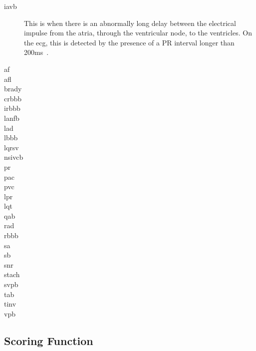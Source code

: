 \documentclass[\main/thesis.tex]{subfiles}
\begin{document}
\begin{description}
    \item[\gls{iavb}] This is when there is an abnormally long delay between the electrical impulse from the atria, through the ventricular node, to the ventricles. On the \gls{ecg}, this is detected by the presence of a PR interval longer than 200ms~\cite{carroz_pseudo-pacemaker_2010}.
    \item[\gls{af}]
    \item[\gls{afl}]
    \item[\gls{brady}]
    \item[\gls{crbbb}]
    \item[\gls{irbbb}]
    \item[\gls{lanfb}]
    \item[\gls{lad}]
    \item[\gls{lbbb}]
    \item[\gls{lqrsv}]
    \item[\gls{nsivcb}]
    \item[\gls{pr}]
    \item[\gls{pac}]
    \item[\gls{pvc}]
    \item[\gls{lpr}]
    \item[\gls{lqt}]
    \item[\gls{qab}]
    \item[\gls{rad}]
    \item[\gls{rbbb}]
    \item[\gls{sa}]
    \item[\gls{sb}]
    \item[\gls{snr}]
    \item[\gls{stach}]
    \item[\gls{svpb}]
    \item[\gls{tab}]
    \item[\gls{tinv}]
    \item[\gls{vpb}]
\end{description}

\subsection{Scoring Function}


\end{document}
